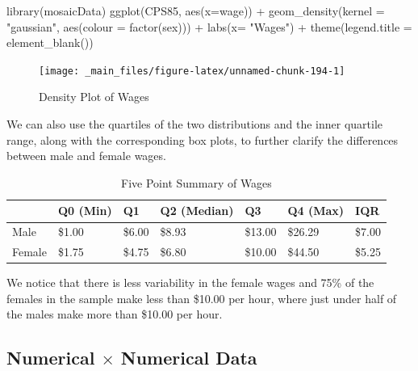 \documentclass[
]{book}
\newenvironment{Shaded}{\begin{snugshade}}{\end{snugshade}}
\newcommand{\AttributeTok}[1]{\textcolor[rgb]{0.77,0.63,0.00}{#1}}
\newcommand{\FunctionTok}[1]{\textcolor[rgb]{0.00,0.00,0.00}{#1}}
\newcommand{\NormalTok}[1]{#1}
\newcommand{\SpecialCharTok}[1]{\textcolor[rgb]{0.00,0.00,0.00}{#1}}
\newcommand{\StringTok}[1]{\textcolor[rgb]{0.31,0.60,0.02}{#1}}
\theoremstyle{definition}
\theoremstyle{definition}
\theoremstyle{definition}
\theoremstyle{definition}
\theoremstyle{remark}
\begin{document}
\begin{Shaded}
\begin{Highlighting}[]
\FunctionTok{library}\NormalTok{(mosaicData)}
\FunctionTok{ggplot}\NormalTok{(CPS85, }\FunctionTok{aes}\NormalTok{(}\AttributeTok{x=}\NormalTok{wage)) }\SpecialCharTok{+} \FunctionTok{geom\_density}\NormalTok{(}\AttributeTok{kernel =} \StringTok{"gaussian"}\NormalTok{, }\FunctionTok{aes}\NormalTok{(}\AttributeTok{colour =} \FunctionTok{factor}\NormalTok{(sex))) }\SpecialCharTok{+} \FunctionTok{labs}\NormalTok{(}\AttributeTok{x=} \StringTok{"Wages"}\NormalTok{) }\SpecialCharTok{+} \FunctionTok{theme}\NormalTok{(}\AttributeTok{legend.title =} \FunctionTok{element\_blank}\NormalTok{())}
\end{Highlighting}
\end{Shaded}

\begin{figure}

{\centering \texttt{[image: \_main\_files/figure-latex/unnamed-chunk-194-1]} 

}

\caption{Density Plot of Wages}\label{fig:unnamed-chunk-194}
\end{figure}

We can also use the quartiles of the two distributions and the inner quartile range, along with the corresponding box plots, to further clarify the differences between male and female wages.

\begin{table}

\caption{\label{tab:unnamed-chunk-195}Five Point Summary of Wages}
\centering
\begin{tabular}[t]{lllllll}
\toprule
  & Q0 (Min) & Q1 & Q2 (Median) & Q3 & Q4 (Max) & IQR\\
\midrule
Male & \$1.00 & \$6.00 & \$8.93 & \$13.00 & \$26.29 & \$7.00\\
Female & \$1.75 & \$4.75 & \$6.80 & \$10.00 & \$44.50 & \$5.25\\
\bottomrule
\end{tabular}
\end{table}

We notice that there is less variability in the female wages and 75\% of the females in the sample make less than \$10.00 per hour, where just under half of the males make more than \$10.00 per hour.

\hypertarget{numerical-times-numerical-data}{%
\subsection{\texorpdfstring{Numerical \(\times\) Numerical Data}{Numerical \textbackslash times Numerical Data}}\label{numerical-times-numerical-data}}
\end{document}
